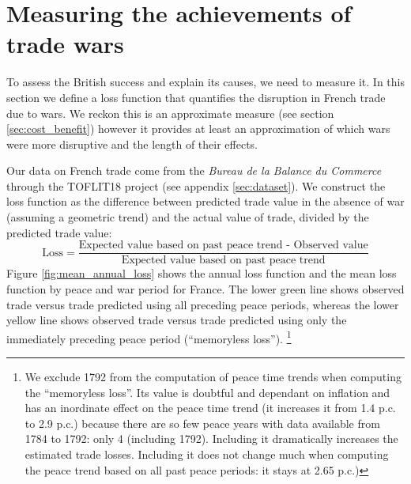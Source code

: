 \documentclass[12pt,a4paper,notitlepage,english]{article}
\begin{document}
\section{Measuring the achievements of trade wars}


To assess the British success and explain its causes, we need to measure it.
In this section we define a loss function that quantifies the disruption in French trade due to wars.
We reckon this is an approximate measure (see section \ref{sec:cost_benefit}) however it provides at least an approximation of which wars were more disruptive and the length of their effects. 


\label{sec:loss}
Our data on French trade come from the \textit{Bureau de la Balance du Commerce} through the TOFLIT18 project (see appendix \ref{sec:dataset}).
We construct the loss function as the difference between predicted trade value in the absence of war (assuming a geometric trend) and the actual value of trade, divided by the predicted trade value:
\begin{equation}
\label{eqn:loss}
\text{Loss} = \frac{\text{Expected value based on past peace trend - Observed value}}{\text{Expected value based on past peace trend}}
\end{equation}
Figure \ref{fig:mean_annual_loss} shows the annual loss function and the mean loss function by peace and war period for France. 
The lower green line shows observed trade versus trade predicted using all preceding peace periods, whereas the lower yellow line shows observed trade versus trade predicted using only the immediately preceding peace period (``memoryless loss'').
\footnote{We exclude 1792 from the computation of peace time trends when computing the ``memoryless loss''. Its value is doubtful and dependant on inflation and has an inordinate effect on the peace time trend (it increases it from 1.4 p.c. to 2.9 p.c.) because there are so few peace years with data available from 1784 to 1792: only 4 (including 1792). Including it dramatically increases the estimated trade losses. Including it does not change much when computing the peace trend based on all past peace periods: it stays at 2.65 p.c.)}
\end{document}
